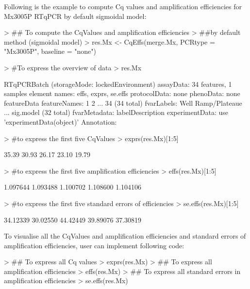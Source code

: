 \documentclass[11pt]{article}
\begin{document}
Following is the example to compute Cq values and amplification efficiencies for Mx3005P RTqPCR by default sigmoidal model: 
\begin{Schunk}
\begin{Sinput}
> ## To compute the CqValues and amplification efficiencies 
> ##by default method (sigmoidal model)
> res.Mx <- CqEffs(merge.Mx, PCRtype = "Mx3005P", baseline = "none")
\end{Sinput}
\end{Schunk}

\begin{Schunk}
\begin{Sinput}
> #To express the overview of data
> res.Mx 
\end{Sinput}
\begin{Soutput}
RTqPCRBatch (storageMode: lockedEnvironment)
assayData: 34 features, 1 samples 
  element names: effs, exprs, se.effs 
protocolData: none
phenoData: none
featureData
  featureNames: 1 2 ... 34 (34 total)
  fvarLabels: Well Ramp/Plateaue ... sig.model (32 total)
  fvarMetadata: labelDescription
experimentData: use 'experimentData(object)'
Annotation:  
\end{Soutput}
\begin{Sinput}
> #to express the first five CqValues
> exprs(res.Mx)[1:5]
\end{Sinput}
\begin{Soutput}
[1] 35.39 30.93 26.17 23.10 19.79
\end{Soutput}
\begin{Sinput}
> #to express the first five amplification efficiencies
> effs(res.Mx)[1:5]
\end{Sinput}
\begin{Soutput}
[1] 1.097644 1.093488 1.100702 1.108600 1.104106
\end{Soutput}
\begin{Sinput}
> #to express the first five standard errors of efficiencies
> se.effs(res.Mx)[1:5] 
\end{Sinput}
\begin{Soutput}
[1] 34.12339 30.02550 44.42449 39.89076 37.30819
\end{Soutput}
\end{Schunk}

To visualise all the CqValues and amplification efficiencies and standard errors of amplification efficiencies,
user can implement following code:

\begin{Schunk}
\begin{Sinput}
> ## To express all Cq values
> exprs(res.Mx)   
> ## To express all amplification efficiencies
> effs(res.Mx)
> ## To express all standard errors in amplification efficiencies
> se.effs(res.Mx)
\end{Sinput}
\end{Schunk}
\end{document}
